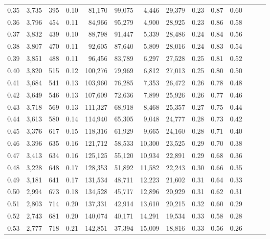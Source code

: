 \begin{tabular}{rrrrrrrrrrrrrr}
0.35 &  3,735 &  395 &  0.10 &   81,170 &   99,075 &   4,446 &  29,379 &  0.23 &  0.87 &      0.60 \\
0.36 &  3,796 &  454 &  0.11 &   84,966 &   95,279 &   4,900 &  28,925 &  0.23 &  0.86 &      0.58 \\
0.37 &  3,832 &  439 &  0.10 &   88,798 &   91,447 &   5,339 &  28,486 &  0.24 &  0.84 &      0.56 \\
0.38 &  3,807 &  470 &  0.11 &   92,605 &   87,640 &   5,809 &  28,016 &  0.24 &  0.83 &      0.54 \\
0.39 &  3,851 &  488 &  0.11 &   96,456 &   83,789 &   6,297 &  27,528 &  0.25 &  0.81 &      0.52 \\
0.40 &  3,820 &  515 &  0.12 &  100,276 &   79,969 &   6,812 &  27,013 &  0.25 &  0.80 &      0.50 \\
0.41 &  3,684 &  541 &  0.13 &  103,960 &   76,285 &   7,353 &  26,472 &  0.26 &  0.78 &      0.48 \\
0.42 &  3,649 &  546 &  0.13 &  107,609 &   72,636 &   7,899 &  25,926 &  0.26 &  0.77 &      0.46 \\
0.43 &  3,718 &  569 &  0.13 &  111,327 &   68,918 &   8,468 &  25,357 &  0.27 &  0.75 &      0.44 \\
0.44 &  3,613 &  580 &  0.14 &  114,940 &   65,305 &   9,048 &  24,777 &  0.28 &  0.73 &      0.42 \\
0.45 &  3,376 &  617 &  0.15 &  118,316 &   61,929 &   9,665 &  24,160 &  0.28 &  0.71 &      0.40 \\
0.46 &  3,396 &  635 &  0.16 &  121,712 &   58,533 &  10,300 &  23,525 &  0.29 &  0.70 &      0.38 \\
0.47 &  3,413 &  634 &  0.16 &  125,125 &   55,120 &  10,934 &  22,891 &  0.29 &  0.68 &      0.36 \\
0.48 &  3,228 &  648 &  0.17 &  128,353 &   51,892 &  11,582 &  22,243 &  0.30 &  0.66 &      0.35 \\
0.49 &  3,181 &  641 &  0.17 &  131,534 &   48,711 &  12,223 &  21,602 &  0.31 &  0.64 &      0.33 \\
0.50 &  2,994 &  673 &  0.18 &  134,528 &   45,717 &  12,896 &  20,929 &  0.31 &  0.62 &      0.31 \\
0.51 &  2,803 &  714 &  0.20 &  137,331 &   42,914 &  13,610 &  20,215 &  0.32 &  0.60 &      0.29 \\
0.52 &  2,743 &  681 &  0.20 &  140,074 &   40,171 &  14,291 &  19,534 &  0.33 &  0.58 &      0.28 \\
0.53 &  2,777 &  718 &  0.21 &  142,851 &   37,394 &  15,009 &  18,816 &  0.33 &  0.56 &      0.26 \\

\end{tabular}
